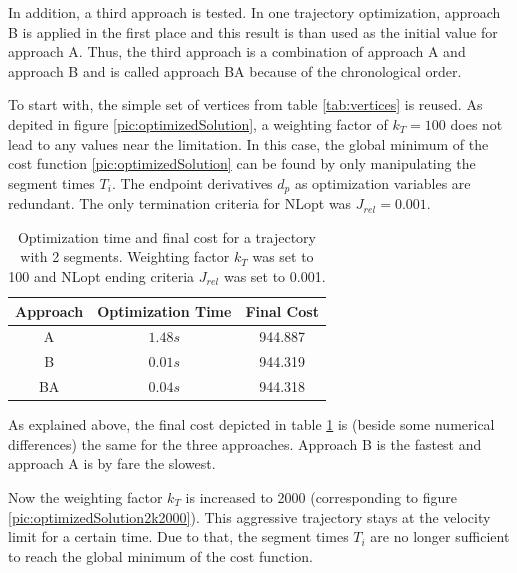 In addition, a third approach is tested. In one trajectory optimization, approach B is applied in the first place and this result is than used as the initial value for approach A. Thus, the third approach is a combination of approach A and approach B and is called approach BA because of the chronological order. \newline

To start with, the simple set of vertices from table \ref{tab:vertices} is reused. As depited in figure \ref{pic:optimizedSolution}, a weighting factor of $k_T = 100$ does not lead to any values near the limitation. In this case, the global minimum of the cost function \ref{pic:optimizedSolution} can be found by only manipulating the segment times $T_i$. The endpoint derivatives $d_p$ as optimization variables are redundant. The only termination criteria for NLopt was $J_{rel} = 0.001$.



\begin{table}[H] 
\begin{center}
    \begin{tabular}{| c | c |  c |}
    \hline
    Approach & Optimization Time & Final Cost \\ \hline
  A & $1.48s$ & 944.887 \\ \hline
  B & $0.01s$ & 944.319 \\ \hline
 BA & $0.04s$ & 944.318 \\
    \hline
    \end{tabular}
    \caption{Optimization time and final cost for a trajectory with 2 segments. Weighting factor $k_T$ was set to 100 and NLopt ending criteria $J_{rel}$ was set to 0.001.}
    \label{tab:ABBA1}
\end{center}
\end{table}


As explained above, the final cost depicted in table \ref{tab:ABBA1} is (beside some numerical differences) the same for the three approaches. Approach B is the fastest and approach A is by fare the slowest. \newline

Now the weighting factor $k_T$ is increased to 2000 (corresponding to figure \ref{pic:optimizedSolution2k2000}). This  aggressive trajectory stays at the velocity limit for a certain time. Due to that, the segment times $T_i$ are no longer sufficient to reach the global minimum of the cost function.

